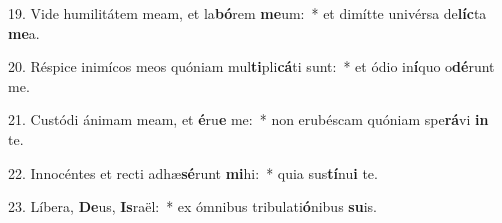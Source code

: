 19. Vide humilitátem meam, et la\textbf{bó}rem \textbf{me}um:~*  et dimítte univérsa de\textbf{líc}ta \textbf{me}a.\

20. Réspice inimícos meos quóniam mul\textbf{ti}pli\textbf{cá}ti sunt:~*  et ódio in\textbf{í}quo o\textbf{dé}runt me.\

21. Custódi ánimam meam, et \textbf{é}ru\textbf{e} me:~*  non erubéscam quóniam spe\textbf{rá}vi \textbf{in} te.\

22. Innocéntes et recti adhæ\textbf{sé}runt \textbf{mi}hi:~*  quia sus\textbf{tí}nu\textbf{i} te.\

23. Líbera, \textbf{De}us, \textbf{Is}raël:~*  ex ómnibus tribulati\textbf{ó}nibus \textbf{su}is.\

